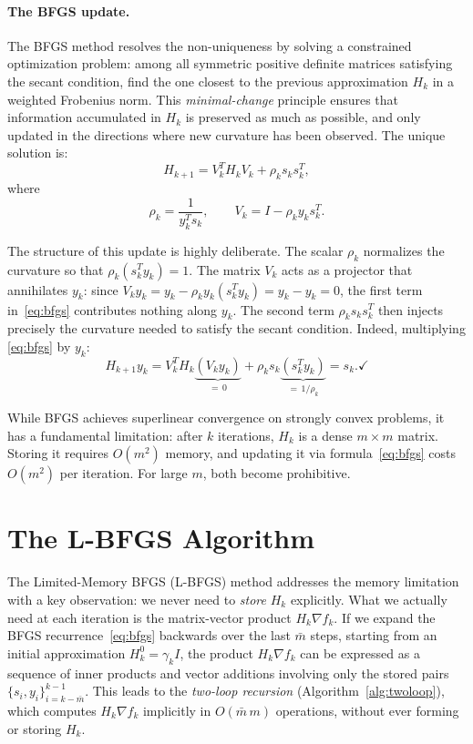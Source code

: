 \paragraph{The BFGS update.}
The BFGS method resolves the non-uniqueness by solving a
constrained optimization problem: among all symmetric positive definite matrices
satisfying the secant condition, find the one closest to the previous
approximation $H_k$ in a weighted Frobenius norm. This \emph{minimal-change}
principle ensures that information accumulated in $H_k$ is preserved as much as
possible, and only updated in the directions where new curvature has been
observed. The unique solution is:
\begin{equation}
\label{eq:bfgs}
    H_{k+1} = V_k^T H_k V_k + \rho_k s_k s_k^T,
\end{equation}
where
\begin{equation}
    \rho_k = \frac{1}{y_k^T s_k}, \qquad V_k = I - \rho_k y_k s_k^T.
\end{equation}

\noindent The structure of this update is highly deliberate. The scalar $\rho_k$
normalizes the curvature so that $\rho_k(s_k^T y_k) = 1$. The matrix $V_k$ acts
as a projector that annihilates $y_k$: since $V_k y_k = y_k - \rho_k y_k
(s_k^T y_k) = y_k - y_k = 0$, the first term in~\eqref{eq:bfgs} contributes
nothing along $y_k$. The second term $\rho_k s_k s_k^T$ then injects precisely
the curvature needed to satisfy the secant condition. Indeed, multiplying
\eqref{eq:bfgs} by $y_k$:
\begin{equation}
    H_{k+1} y_k
    = V_k^T H_k \underbrace{(V_k y_k)}_{=\,0}
      + \rho_k s_k \underbrace{(s_k^T y_k)}_{=\,1/\rho_k}
    = s_k. \checkmark
\end{equation}

\noindent While BFGS achieves superlinear convergence on strongly convex problems,
it has a fundamental limitation: after $k$ iterations, $H_k$ is a dense
$m \times m$ matrix. Storing it requires $O(m^2)$ memory, and updating it via
formula~\eqref{eq:bfgs} costs $O(m^2)$ per iteration. For large $m$, both
become prohibitive.


\section{The L-BFGS Algorithm}

\noindent The Limited-Memory BFGS (L-BFGS) method addresses
the memory limitation with a key observation: we never need to \emph{store} $H_k$
explicitly. What we actually need at each iteration is the matrix-vector product
$H_k \nabla f_k$. If we expand the BFGS recurrence~\eqref{eq:bfgs} backwards
over the last $\bar{m}$ steps, starting from an initial approximation
$H_k^0 = \gamma_k I$, the product $H_k \nabla f_k$ can be expressed as a
sequence of inner products and vector additions involving only the stored pairs
$\{s_i, y_i\}_{i=k-\bar{m}}^{k-1}$. This leads to the \emph{two-loop recursion}
(Algorithm~\ref{alg:twoloop}), which computes $H_k \nabla f_k$ implicitly in
$O(\bar{m}\,m)$ operations, without ever forming or storing $H_k$.

